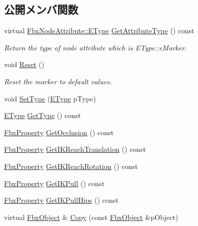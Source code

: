 \subsection*{公開メンバ関数}
\begin{DoxyCompactItemize}
\item 
virtual \hyperlink{class_fbx_node_attribute_a08e1669d3d1a696910756ab17de56d6a}{Fbx\+Node\+Attribute\+::\+E\+Type} \hyperlink{class_fbx_marker_a46b62e421142c41e188a62ab3963493c}{Get\+Attribute\+Type} () const
\begin{DoxyCompactList}\small\item\em Return the type of node attribute which is E\+Type\+::e\+Marker. \end{DoxyCompactList}\item 
void \hyperlink{class_fbx_marker_aec39701adcdce372adbd766c7d21f3f1}{Reset} ()
\begin{DoxyCompactList}\small\item\em Reset the marker to default values. \end{DoxyCompactList}\item 
void \hyperlink{class_fbx_marker_a4eccced9aa474303db161feadf97ac09}{Set\+Type} (\hyperlink{class_fbx_marker_ad1e38753dce9a2212df0364466d9f617}{E\+Type} p\+Type)
\item 
\hyperlink{class_fbx_marker_ad1e38753dce9a2212df0364466d9f617}{E\+Type} \hyperlink{class_fbx_marker_a2e56a2327718ba1d00f945f757334c91}{Get\+Type} () const
\item 
\hyperlink{class_fbx_property}{Fbx\+Property} \hyperlink{class_fbx_marker_a8ffa4c00aae9d7f23e1c133dd7520c3e}{Get\+Occlusion} () const
\item 
\hyperlink{class_fbx_property}{Fbx\+Property} \hyperlink{class_fbx_marker_afa65bea29bdabf19c1f1076c31c2a59d}{Get\+I\+K\+Reach\+Translation} () const
\item 
\hyperlink{class_fbx_property}{Fbx\+Property} \hyperlink{class_fbx_marker_a5e7e9d3e6ed1778fcb6677aff71f721c}{Get\+I\+K\+Reach\+Rotation} () const
\item 
\hyperlink{class_fbx_property}{Fbx\+Property} \hyperlink{class_fbx_marker_a7627d463d7ec1f933206d512998d2924}{Get\+I\+K\+Pull} () const
\item 
\hyperlink{class_fbx_property}{Fbx\+Property} \hyperlink{class_fbx_marker_a09dac448601eb60dffb30ad24ec8ba7d}{Get\+I\+K\+Pull\+Hips} () const
\item 
virtual \hyperlink{class_fbx_object}{Fbx\+Object} \& \hyperlink{class_fbx_marker_a935603050774e09ec8b3d2a5200bbbc7}{Copy} (const \hyperlink{class_fbx_object}{Fbx\+Object} \&p\+Object)
\end{DoxyCompactItemize}
